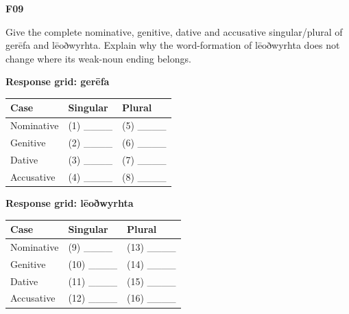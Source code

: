 \par\begin{minipage}{\linewidth}\raggedright
\textbf{F09}

Give the complete nominative, genitive, dative and accusative singular/\allowbreak{}plural of gerēfa and lēoðwyrhta. Explain why the word-formation of lēoðwyrhta does not change where its weak-noun ending belongs.

\textbf{Response grid: gerēfa}

\par\begingroup
\fontsize{10.5}{13.2}\selectfont
\setlength{\LTleft}{0pt}\setlength{\LTright}{\fill}
\noindent
\begin{tabular}{@{}>{\raggedright\arraybackslash}p{39.46mm}>{\raggedright\arraybackslash}p{39.46mm}>{\raggedright\arraybackslash}p{39.46mm}@{}}
\toprule
\textbf{Case} & \textbf{Singular} & \textbf{Plural} \\
\midrule
Nominative & (1) \_\_\_\_ & (5) \_\_\_\_ \\
Genitive & (2) \_\_\_\_ & (6) \_\_\_\_ \\
Dative & (3) \_\_\_\_ & (7) \_\_\_\_ \\
Accusative & (4) \_\_\_\_ & (8) \_\_\_\_ \\
\bottomrule
\end{tabular}
\par\endgroup

\textbf{Response grid: lēoðwyrhta}

\par\begingroup
\fontsize{10.5}{13.2}\selectfont
\setlength{\LTleft}{0pt}\setlength{\LTright}{\fill}
\noindent
\begin{tabular}{@{}>{\raggedright\arraybackslash}p{39.46mm}>{\raggedright\arraybackslash}p{39.46mm}>{\raggedright\arraybackslash}p{39.46mm}@{}}
\toprule
\textbf{Case} & \textbf{Singular} & \textbf{Plural} \\
\midrule
Nominative & (9) \_\_\_\_ & (13) \_\_\_\_ \\
Genitive & (10) \_\_\_\_ & (14) \_\_\_\_ \\
Dative & (11) \_\_\_\_ & (15) \_\_\_\_ \\
Accusative & (12) \_\_\_\_ & (16) \_\_\_\_ \\
\bottomrule
\end{tabular}
\par\endgroup


\end{minipage}
